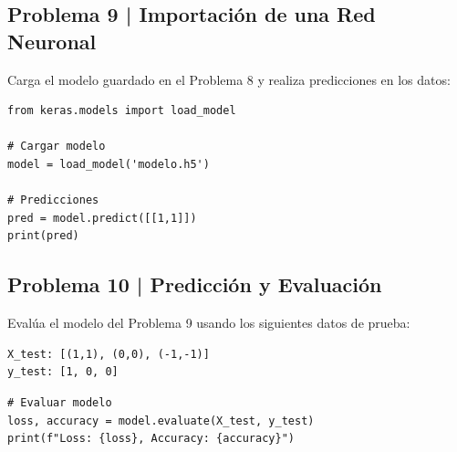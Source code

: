 \documentclass{article}
\begin{document}
\clearpage

\subsection*{Problema 9 | Importación de una Red Neuronal}

Carga el modelo guardado en el Problema 8 y realiza predicciones en los datos:

\begin{lstlisting}[style=python]
from keras.models import load_model

# Cargar modelo
model = load_model('modelo.h5')

# Predicciones
pred = model.predict([[1,1]])
print(pred)
\end{lstlisting}

\clearpage

\subsection*{Problema 10 | Predicción y Evaluación}

Evalúa el modelo del Problema 9 usando los siguientes datos de prueba:

\begin{verbatim}
X_test: [(1,1), (0,0), (-1,-1)]
y_test: [1, 0, 0]
\end{verbatim}

\begin{lstlisting}[style=python]
# Evaluar modelo
loss, accuracy = model.evaluate(X_test, y_test)
print(f"Loss: {loss}, Accuracy: {accuracy}")
\end{lstlisting}
\end{document}
